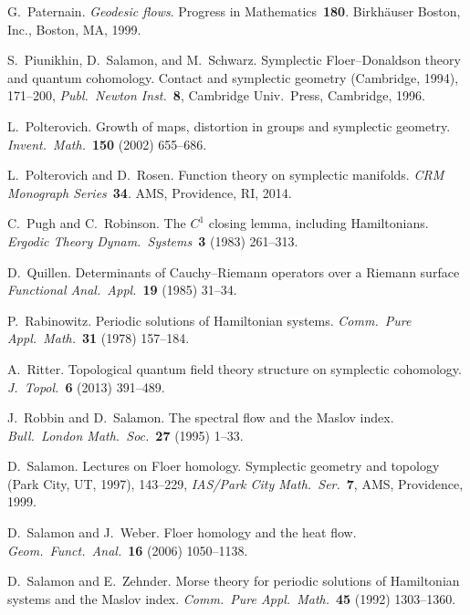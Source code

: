 \documentclass[12pt,twoside]{amsart}
\theoremstyle{plain}
\numberwithin{figure}{section}
\numberwithin{equation}{section}
\begin{document}
\begin{thebibliography}{999}
G.\ Paternain.
{\it Geodesic flows}. 
Progress in Mathematics~{\bf 180}. 
Birkh\"auser Boston, Inc., Boston, MA, 1999. 

S.\ Piunikhin, D.\ Salamon, and M.\ Schwarz.
Symplectic Floer--Donaldson theory and quantum cohomology. 
Contact and symplectic geometry (Cambridge, 1994), 171--200, 
{\it Publ.\ Newton Inst.}~{\bf 8}, Cambridge Univ.\ Press, Cambridge, 1996.

L.\ Polterovich.
Growth of maps, distortion in groups and symplectic geometry. 
{\it Invent.\ Math.}~{\bf 150} (2002) 655--686.  

L.\ Polterovich and D.\ Rosen.
Function theory on symplectic manifolds. 
{\it CRM Monograph Series}~{\bf 34}. AMS, Providence, RI, 2014. 

C.\ Pugh and C.\ Robinson.
The $C^1$ closing lemma, including Hamiltonians. 
{\it Ergodic Theory Dynam.\ Systems}~{\bf 3} (1983) 261--313.

D.\ Quillen.
Determinants of Cauchy--Riemann operators over a Riemann surface
{\it Functional Anal.\ Appl.}~{\bf 19} (1985) 31--34.

P.\ Rabinowitz.
Periodic solutions of Hamiltonian systems. 
{\it Comm.\ Pure Appl.\ Math.}~{\bf 31} (1978) 157--184.

A.~Ritter.   
Topological quantum field theory structure on symplectic cohomology.
{\it J.\ Topol.}~{\bf 6} (2013) 391--489.

J.\ Robbin and D.\ Salamon.
The spectral flow and the Maslov index. 
{\it Bull.\ London Math.\ Soc.}~{\bf 27} (1995) 1--33.


D.\ Salamon.
Lectures on Floer homology. 
Symplectic geometry and topology (Park City, UT, 1997), 143--229,
{\it IAS/Park City Math.\ Ser.}~{\bf 7}, AMS, Providence, 1999. 

D.\ Salamon and J.\ Weber.
Floer homology and the heat flow. 
{\it Geom.\ Funct.\ Anal.}~{\bf 16} (2006) 1050--1138.


D.\ Salamon and E.\ Zehnder.
Morse theory for periodic solutions of Hamiltonian systems and the Maslov index. 
{\it Comm.\ Pure Appl.\ Math.}~{\bf 45} (1992) 1303--1360.


\end{thebibliography}
\end{document}
